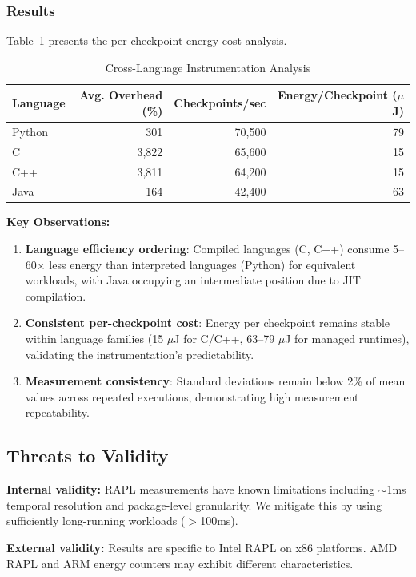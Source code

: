 \subsubsection{Results}

Table~\ref{tab:crosslang} presents the per-checkpoint energy cost analysis.

\begin{table}[htbp]
\centering
\caption{Cross-Language Instrumentation Analysis}
\label{tab:crosslang}
\begin{tabular}{lrrr}
\toprule
Language & Avg. Overhead (\%) & Checkpoints/sec & Energy/Checkpoint ($\mu$J) \\
\midrule
Python & 301 & 70,500 & 79 \\
C & 3,822 & 65,600 & 15 \\
C++ & 3,811 & 64,200 & 15 \\
Java & 164 & 42,400 & 63 \\
\bottomrule
\end{tabular}
\end{table}

\textbf{Key Observations:}
\begin{enumerate}
    \item \textbf{Language efficiency ordering}: Compiled languages (C, C++) consume 5--60$\times$ less energy than interpreted languages (Python) for equivalent workloads, with Java occupying an intermediate position due to JIT compilation.
    \item \textbf{Consistent per-checkpoint cost}: Energy per checkpoint remains stable within language families (15 $\mu$J for C/C++, 63--79 $\mu$J for managed runtimes), validating the instrumentation's predictability.
    \item \textbf{Measurement consistency}: Standard deviations remain below 2\% of mean values across repeated executions, demonstrating high measurement repeatability.
\end{enumerate}

\subsection{Threats to Validity}

\textbf{Internal validity:} RAPL measurements have known limitations including $\sim$1ms temporal resolution and package-level granularity. We mitigate this by using sufficiently long-running workloads ($>$100ms).

\textbf{External validity:} Results are specific to Intel RAPL on x86 platforms. AMD RAPL and ARM energy counters may exhibit different characteristics.

